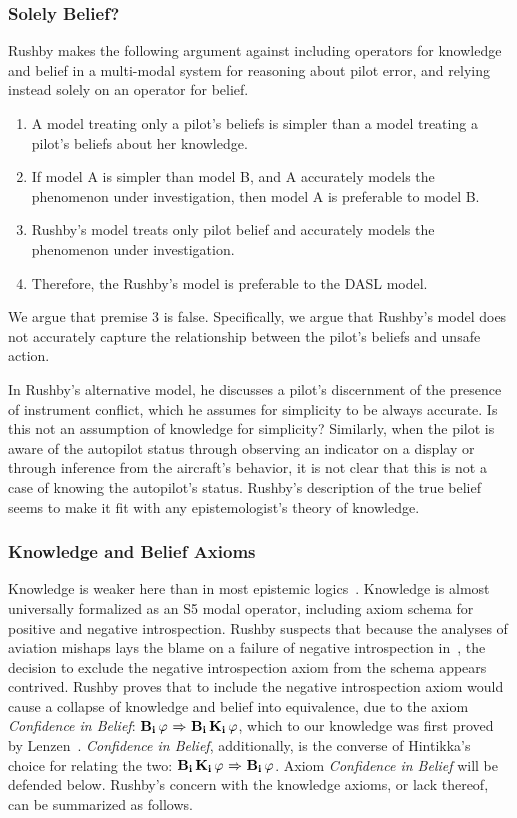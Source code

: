 \subsubsection*{Solely Belief?}
Rushby makes the following argument against including operators for knowledge and belief in a multi-modal system for reasoning about pilot error, and relying instead solely on an operator for belief.
\begin{enumerate}
	\item A model treating only a pilot's beliefs is simpler than a model treating a pilot's beliefs about her knowledge.
	\item If model A is simpler than model B, and A accurately models the phenomenon under investigation, then model A is preferable to model B.
	\item Rushby's model treats only pilot belief and accurately models the phenomenon under investigation.
	\item Therefore, the Rushby's model is preferable to the DASL model.
\end{enumerate}

We argue that premise 3 is false. Specifically, we argue that Rushby's model does not accurately capture the relationship between the pilot's beliefs and unsafe action.

In Rushby's alternative model, he discusses a pilot's discernment of the presence of instrument conflict, which he assumes for simplicity to be always accurate. Is this not an assumption of knowledge for simplicity? Similarly, when the pilot is aware of the autopilot status through observing an indicator on a display or through inference from the aircraft's behavior, it is not clear that this is not a case of knowing the autopilot's status. Rushby's description of the true belief seems to make it fit with any epistemologist's theory of knowledge. 

\subsubsection*{Knowledge and Belief Axioms}
Knowledge is weaker here than in most epistemic logics~\cite{FHMV,DEL,Hintikka}. Knowledge is almost universally formalized as an S5 modal operator, including axiom schema for positive and negative introspection. Rushby suspects that because the analyses of aviation mishaps lays the blame on a failure of negative introspection in~\cite{AhrenbachGoodloe}, the decision to exclude the negative introspection axiom from the schema appears contrived. Rushby proves that to include the negative introspection axiom would cause a collapse of knowledge and belief into equivalence, due to the axiom \emph{Confidence in Belief}: $\mathbf{B}_{\mathbf{i}}\,\varphi {\ \Rightarrow \ } \mathbf{B}_{\mathbf{i}}\,\mathbf{K}_{\mathbf{i}}\,\varphi$, which to our knowledge was first proved by Lenzen~\cite{Lenzen}. \emph{Confidence in Belief}, additionally, is the converse of Hintikka's choice for relating the two: $\mathbf{B}_{\mathbf{i}}\,\mathbf{K}_{\mathbf{i}}\,\varphi {\ \Rightarrow \ } \mathbf{B}_{\mathbf{i}}\,\varphi$. Axiom \emph{Confidence in Belief} will be defended below. Rushby's concern with the knowledge axioms, or lack thereof, can be summarized as follows.

